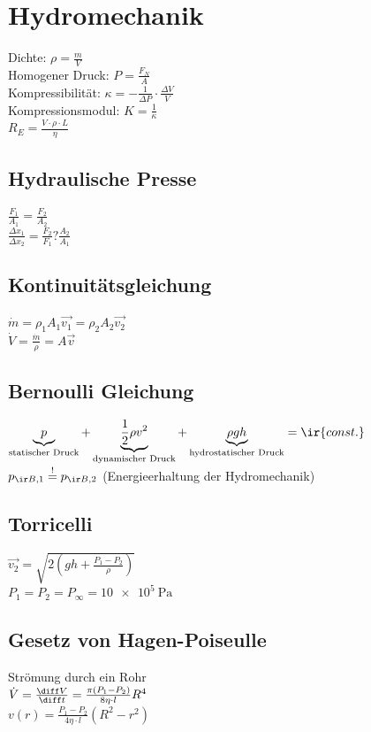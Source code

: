 \documentclass[german]{latex4ei/latex4ei_sheet}
\begin{document}
\section{Hydromechanik}
\begin{sectionbox}
Dichte: $\rho=\frac{m}{V}$\\
Homogener Druck: $P=\frac{F_N}{A}$\\
Kompressibilität: $\kappa = -\frac{1}{\Delta P}\cdot \frac{\Delta V}{V}$\\
Kompressionsmodul: $K=\frac{1}{\kappa}$\\
$R_E= \frac{V\cdot \rho \cdot L}{\eta}$

\subsection{Hydraulische Presse}
$\frac{F_1}{A_1}=\frac{F_2}{A_2}$ \\
$\frac{\Delta x_1}{\Delta x_2}=\frac{F_2}{F_1}?\frac{A_2}{A_1}$
\subsection{Kontinuitätsgleichung}
$\dot{m}=\rho_1 A_1 \vec{v_1}=\rho_2 A_2 \vec{v_2}$\\
$\dot{V}=\frac{\dot{m}}{\rho}=A\vec{v}$

\subsection{Bernoulli Gleichung}
$\underbrace{p}_{\text{statischer Druck}} 
+ \underbrace{\frac{1}{2} \rho v^2}_{\text{dynamischer Druck}} 
+ \underbrace{\rho gh}_{\text{hydrostatischer Druck}} = \ir{const.}$\\
$p_{\ir B,1}\stackrel{!}{=}p_{\ir B,2}$
(Energieerhaltung der Hydromechanik)

\subsection{Torricelli}
$\vec{v_2}=\sqrt{2(gh+\frac{P_1-P_2}{\rho})}$\\
$P_1=P_2=P_\infty = \SI{10e5}{\pascal}$

\subsection{Gesetz von Hagen-Poiseulle}
Strömung durch ein Rohr\\
$\dot{V}=\frac{\diff V}{\diff t}=\frac{\pi (P_1-P_2)}{8\eta \cdot l}R^4$\\
$v(r)=\frac{P_1-P_2}{4\eta \cdot l}(R^2-r^2)$


\end{sectionbox}
\end{document}
